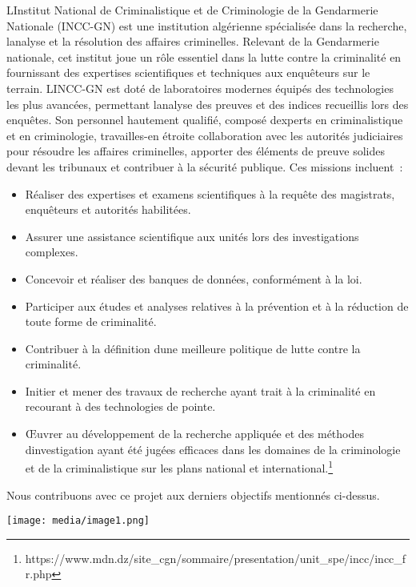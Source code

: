 \documentclass[
]{article}
\begin{document}
L\textquotesingle Institut National de Criminalistique et de
Criminologie de la Gendarmerie Nationale (INCC-GN) est une institution
algérienne spécialisée dans la recherche, l\textquotesingle analyse et
la résolution des affaires criminelles. Relevant de la Gendarmerie
nationale, cet institut joue un rôle essentiel dans la lutte contre la
criminalité en fournissant des expertises scientifiques et techniques
aux enquêteurs sur le terrain. L\textquotesingle INCC-GN est doté de
laboratoires modernes équipés des technologies les plus avancées,
permettant l\textquotesingle analyse des preuves et des indices
recueillis lors des enquêtes. Son personnel hautement qualifié, composé
d\textquotesingle experts en criminalistique et en criminologie,
travailles-en étroite collaboration avec les autorités judiciaires pour
résoudre les affaires criminelles, apporter des éléments de preuve
solides devant les tribunaux et contribuer à la sécurité publique. Ces
missions incluent~:

\begin{itemize}
\item
  Réaliser des expertises et examens scientifiques à la requête des
  magistrats, enquêteurs et autorités habilitées.
\item
  Assurer une assistance scientifique aux unités lors des investigations
  complexes.
\item
  Concevoir et réaliser des banques de données, conformément à la loi.
\item
  Participer aux études et analyses relatives à la prévention et à la
  réduction de toute forme de criminalité.
\item
  Contribuer à la définition d\textquotesingle une meilleure politique
  de lutte contre la criminalité.
\item
  Initier et mener des travaux de recherche ayant trait à la criminalité
  en recourant à des technologies de pointe.
\item
  Œuvrer au développement de la recherche appliquée et des méthodes
  d\textquotesingle investigation ayant été jugées efficaces dans les
  domaines de la criminologie et de la criminalistique sur les plans
  national et international.\footnote{https://www.mdn.dz/site\_cgn/sommaire/presentation/unit\_spe/incc/incc\_fr.php}
\end{itemize}

Nous contribuons avec ce projet aux derniers objectifs mentionnés
ci-dessus.

\texttt{[image: media/image1.png]}
\end{document}
